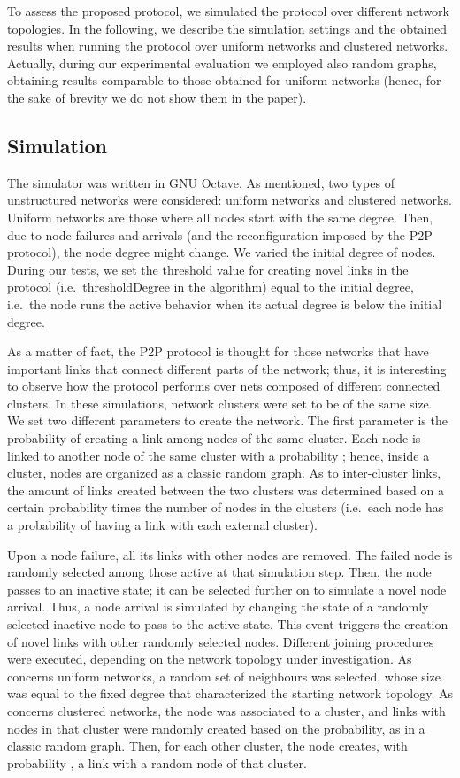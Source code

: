 \documentclass{www13-companion-accepted}
\begin{document}
To assess the proposed protocol, we simulated the protocol over different network topologies. In the following, we describe the simulation settings and the obtained results when running the protocol over uniform networks and clustered networks. 
Actually, during our experimental evaluation we employed also random graphs, obtaining results comparable to those obtained for uniform networks (hence, for the sake of brevity we do not show them in the paper). 

\subsection{Simulation}

The simulator was written in GNU Octave.
As mentioned, two types of unstructured networks were considered: uniform networks and clustered networks. 
Uniform networks are those where all nodes start with the same degree. Then, due to node failures and arrivals (and the reconfiguration imposed by the P2P protocol), the node degree might change.
We varied the initial degree of nodes. During our tests, we set the threshold value for creating novel links in the protocol (i.e.~thresholdDegree in the algorithm) equal to the initial degree, i.e.~the node runs the active behavior when its actual degree is below the initial degree.

As a matter of fact, the P2P protocol is thought for those networks that have important links that connect different parts of the network; thus, it is interesting to observe how the protocol performs over nets composed of different connected clusters.
In these simulations, network clusters were set to be of the same size.
We set two different parameters to create the network. The first parameter is the probability  of creating a link among nodes of the same cluster. Each node is linked to another node of the same cluster with a probability ; hence, inside a cluster, nodes are organized as a classic random graph.
As to inter-cluster links, the amount of links created between the two clusters was determined based on a certain probability  times the number of nodes in the clusters (i.e.~each node has a probability  of having a link with each external cluster).

Upon a node failure, all its links with other nodes are removed. The failed node is randomly selected among those active at that simulation step. Then, the node passes to an inactive state; it can be selected further on to simulate a novel node arrival.
Thus, a node arrival is simulated by changing the state of a randomly selected inactive node to pass to the active state. This event triggers the creation of novel links with other randomly selected nodes. 
Different joining procedures were executed, depending on the network topology under investigation. 
As concerns uniform networks, a random set of neighbours was selected, whose size was equal to the fixed degree that characterized the starting network topology.
As concerns clustered networks, the node was associated to a cluster, and links with nodes in that cluster were randomly created based on the  probability, as in a classic random graph. Then, for each other cluster, the node creates, with probability , a link with a random node of that cluster.
\end{document}
